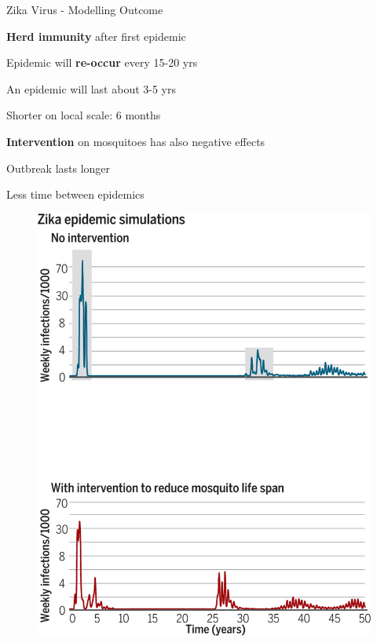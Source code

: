 \documentclass[table]{beamer}\usepackage[]{graphicx}\usepackage[]{color}
\begin{document}
\begin{frame}[fragile]{Zika Virus - Modelling Outcome} %

\begin{minipage}{.52\textwidth}
\textbf{Herd immunity} after first epidemic  \par
\vspace{0.3cm}
Epidemic will \textbf{re-occur} every 15-20 yrs \par
\vspace{0.3cm}
An epidemic will last about 3-5 yrs \par
\vspace{0.1cm}
\hspace*{0.5cm}Shorter on local scale: 6 months \par
\vspace{0.3cm}
\textbf{Intervention} on mosquitoes has also negative effects \par
\hspace*{0.5cm} Outbreak lasts longer \par
\hspace*{0.5cm} Less time between epidemics
\end{minipage} \hfill
\begin{minipage} {.45\textwidth}
\begin{figure}
  \centering
  \includegraphics[width=\textwidth,keepaspectratio]{Zika_results2.jpg}
\end{figure}
\end{minipage}\par
\vfill
{\scriptsize \cite{ferguson2016}}
\end{frame}
\end{document}
